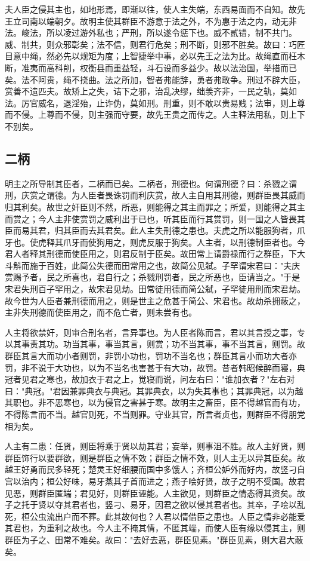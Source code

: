 \documentclass[]{article}
\begin{document}
夫人臣之侵其主也，如地形焉，即渐以往，使人主失端，东西易面而不自知。故先王立司南以端朝夕。故明主使其群臣不游意于法之外，不为惠于法之内，动无非法。峻法，所以凌过游外私也；严刑，所以遂令惩下也。威不贰错，制不共门。威、制共，则众邪彰矣；法不信，则君行危矣；刑不断，则邪不胜矣。故曰：巧匠目意中绳，然必先以规矩为度；上智捷举中事，必以先王之法为比。故绳直而枉木断，准夷而高科削，权衡县而重益轻，斗石设而多益少。故以法治国，举措而已矣。法不阿贵，绳不挠曲。法之所加，智者弗能辞，勇者弗敢争。刑过不辟大臣，赏善不遗匹夫。故矫上之失，诘下之邪，治乱决缪，绌羡齐非，一民之轨，莫如法。厉官威名，退淫殆，止诈伪，莫如刑。刑重，则不敢以贵易贱；法审，则上尊而不侵。上尊而不侵，则主强而守要，故先王贵之而传之。人主释法用私，则上下不别矣。

\hypertarget{header-n846}{%
\subsection{二柄}\label{header-n846}}

明主之所导制其臣者，二柄而已矣。二柄者，刑德也。何谓刑德？曰：杀戮之谓刑，庆赏之谓德。为人臣者畏诛罚而利庆赏，故人主自用其刑德，则群臣畏其威而归其利矣。故世之奸臣则不然，所恶，则能得之其主而罪之；所爱，则能得之其主而赏之；今人主非使赏罚之威利出于已也，听其臣而行其赏罚，则一国之人皆畏其臣而易其君，归其臣而去其君矣。此人主失刑德之患也。夫虎之所以能服狗者，爪牙也。使虎释其爪牙而使狗用之，则虎反服于狗矣。人主者，以刑德制臣者也。今君人者释其刑德而使臣用之，则君反制于臣矣。故田常上请爵禄而行之群臣，下大斗斛而施于百姓，此简公失德而田常用之也，故简公见弑。子罕谓宋君曰："夫庆赏赐予者，民之所喜也，君自行之；杀戮刑罚者，民之所恶也，臣请当之。"于是宋君失刑百子罕用之，故宋君见劫。田常徒用德而简公弑，子罕徒用刑而宋君劫。故今世为人臣者兼刑德而用之，则是世主之危甚于简公、宋君也。故劫杀拥蔽之，主非失刑德而使臣用之，而不危亡者，则未尝有也。

人主将欲禁奸，则审合刑名者，言异事也。为人臣者陈而言，君以其言授之事，专以其事责其功。功当其事，事当其言，则赏；功不当其事，事不当其言，则罚。故群臣其言大而功小者则罚，非罚小功也，罚功不当名也；群臣其言小而功大者亦罚，非不说于大功也，以为不当名也害甚于有大功，故罚。昔者韩昭候醉而寝，典冠者见君之寒也，故加衣于君之上，觉寝而说，问左右曰："谁加衣者？"左右对曰："典冠。"君因兼罪典衣与典冠。其罪典衣，以为失其事也；其罪典冠，以为越其职也。非不恶寒也，以为侵官之害甚于寒。故明主之畜臣，臣不得越官而有功，不得陈言而不当。越官则死，不当则罪。守业其官，所言者贞也，则群臣不得朋党相为矣。

人主有二患：任贤，则臣将乘于贤以劫其君；妄举，则事沮不胜。故人主好贤，则群臣饰行以要群欲，则是群臣之情不效；群臣之情不效，则人主无以异其臣矣。故越王好勇而民多轻死；楚灵王好细腰而国中多饿人；齐桓公妒外而好内，故竖刁自宫以治内；桓公好味，易牙蒸其子首而进之；燕子哙好贤，故子之明不受国。故君见恶，则群臣匿端；君见好，则群臣诬能。人主欲见，则群臣之情态得其资矣。故子之托于贤以夺其君者也，竖刁、易牙，因君之欲以侵其君者也。其卒，子哙以乱死，桓公虫流出户而不葬。此其故何也？人君以情借臣之患也。人臣之情非必能爱其君也，为重利之故也。今人主不掩其情，不匿其端，而使人臣有缘以侵其主，则群臣为子之、田常不难矣。故曰："去好去恶，群臣见素。"群臣见素，则大君大蔽矣。
\end{document}
